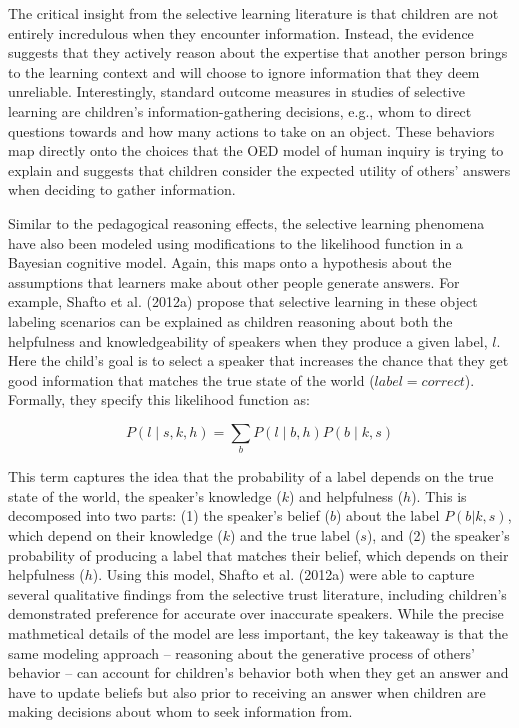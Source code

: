 \documentclass[english,floatsintext,man]{apa6}
\theoremstyle{definition}
\theoremstyle{definition}
\theoremstyle{definition}
\theoremstyle{remark}
\begin{document}
The critical insight from the selective learning literature is that
children are not entirely incredulous when they encounter information.
Instead, the evidence suggests that they actively reason about the
expertise that another person brings to the learning context and will
choose to ignore information that they deem unreliable. Interestingly,
standard outcome measures in studies of selective learning are
children's information-gathering decisions, e.g., whom to direct
questions towards and how many actions to take on an object. These
behaviors map directly onto the choices that the OED model of human
inquiry is trying to explain and suggests that children consider the
expected utility of others' answers when deciding to gather information.

Similar to the pedagogical reasoning effects, the selective learning
phenomena have also been modeled using modifications to the likelihood
function in a Bayesian cognitive model. Again, this maps onto a
hypothesis about the assumptions that learners make about other people
generate answers. For example, Shafto et al. (2012a) propose that
selective learning in these object labeling scenarios can be explained
as children reasoning about both the helpfulness and knowledgeability of
speakers when they produce a given label, \(l\). Here the child's goal
is to select a speaker that increases the chance that they get good
information that matches the true state of the world
(\(label=correct\)). Formally, they specify this likelihood function as:

\[P(l \mid s,k,h) = \sum_b P(l \mid b,h)P(b \mid k,s)\]

\noindent
This term captures the idea that the probability of a label depends on
the true state of the world, the speaker's knowledge (\(k\)) and
helpfulness (\(h\)). This is decomposed into two parts: (1) the
speaker's belief (\(b\)) about the label \(P(b|k,s)\), which depend on
their knowledge (\(k\)) and the true label (\(s\)), and (2) the
speaker's probability of producing a label that matches their belief,
which depends on their helpfulness (\(h\)). Using this model, Shafto et
al. (2012a) were able to capture several qualitative findings from the
selective trust literature, including children's demonstrated preference
for accurate over inaccurate speakers. While the precise mathmetical
details of the model are less important, the key takeaway is that the
same modeling approach -- reasoning about the generative process of
others' behavior -- can account for children's behavior both when they
get an answer and have to update beliefs but also prior to receiving an
answer when children are making decisions about whom to seek information
from.
\end{document}
